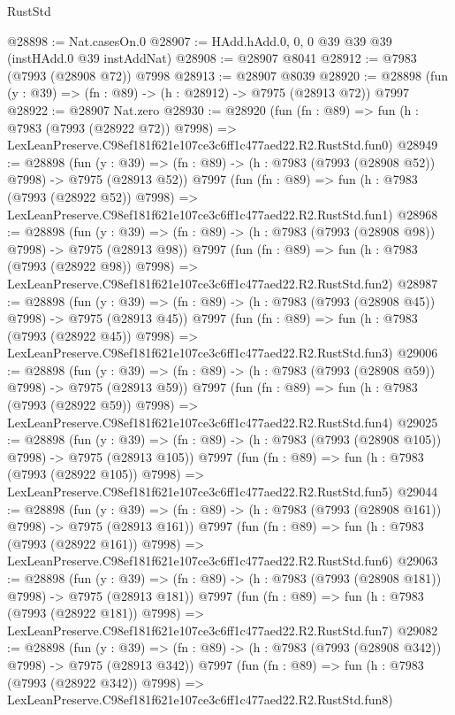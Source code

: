 \begin{lexlean}{RustStd}
\begin{coremodule}
@28898 := Nat.casesOn.{0}
@28907 := HAdd.hAdd.{0, 0, 0} @39 @39 @39 (instHAdd.{0} @39 instAddNat)
@28908 := @28907 @8041
@28912 := @7983 (@7993 (@28908 @72)) @7998
@28913 := @28907 @8039
@28920 := @28898 (fun (y : @39) => (fn : @89) -> (h : @28912) -> @7975 (@28913 @72)) @7997
@28922 := @28907 Nat.zero
@28930 := @28920
    (fun (fn : @89) =>
    fun (h : @7983 (@7993 (@28922 @72)) @7998) =>
    LexLeanPreserve.C98ef181f621e107ce3c6ff1c477aed22.R2.RustStd.fun0)
@28949 := @28898
    (fun (y : @39) => (fn : @89) -> (h : @7983 (@7993 (@28908 @52)) @7998) -> @7975 (@28913 @52))
    @7997
    (fun (fn : @89) =>
    fun (h : @7983 (@7993 (@28922 @52)) @7998) =>
    LexLeanPreserve.C98ef181f621e107ce3c6ff1c477aed22.R2.RustStd.fun1)
@28968 := @28898
    (fun (y : @39) => (fn : @89) -> (h : @7983 (@7993 (@28908 @98)) @7998) -> @7975 (@28913 @98))
    @7997
    (fun (fn : @89) =>
    fun (h : @7983 (@7993 (@28922 @98)) @7998) =>
    LexLeanPreserve.C98ef181f621e107ce3c6ff1c477aed22.R2.RustStd.fun2)
@28987 := @28898
    (fun (y : @39) => (fn : @89) -> (h : @7983 (@7993 (@28908 @45)) @7998) -> @7975 (@28913 @45))
    @7997
    (fun (fn : @89) =>
    fun (h : @7983 (@7993 (@28922 @45)) @7998) =>
    LexLeanPreserve.C98ef181f621e107ce3c6ff1c477aed22.R2.RustStd.fun3)
@29006 := @28898
    (fun (y : @39) => (fn : @89) -> (h : @7983 (@7993 (@28908 @59)) @7998) -> @7975 (@28913 @59))
    @7997
    (fun (fn : @89) =>
    fun (h : @7983 (@7993 (@28922 @59)) @7998) =>
    LexLeanPreserve.C98ef181f621e107ce3c6ff1c477aed22.R2.RustStd.fun4)
@29025 := @28898
    (fun (y : @39) => (fn : @89) -> (h : @7983 (@7993 (@28908 @105)) @7998) -> @7975 (@28913 @105))
    @7997
    (fun (fn : @89) =>
    fun (h : @7983 (@7993 (@28922 @105)) @7998) =>
    LexLeanPreserve.C98ef181f621e107ce3c6ff1c477aed22.R2.RustStd.fun5)
@29044 := @28898
    (fun (y : @39) => (fn : @89) -> (h : @7983 (@7993 (@28908 @161)) @7998) -> @7975 (@28913 @161))
    @7997
    (fun (fn : @89) =>
    fun (h : @7983 (@7993 (@28922 @161)) @7998) =>
    LexLeanPreserve.C98ef181f621e107ce3c6ff1c477aed22.R2.RustStd.fun6)
@29063 := @28898
    (fun (y : @39) => (fn : @89) -> (h : @7983 (@7993 (@28908 @181)) @7998) -> @7975 (@28913 @181))
    @7997
    (fun (fn : @89) =>
    fun (h : @7983 (@7993 (@28922 @181)) @7998) =>
    LexLeanPreserve.C98ef181f621e107ce3c6ff1c477aed22.R2.RustStd.fun7)
@29082 := @28898
    (fun (y : @39) => (fn : @89) -> (h : @7983 (@7993 (@28908 @342)) @7998) -> @7975 (@28913 @342))
    @7997
    (fun (fn : @89) =>
    fun (h : @7983 (@7993 (@28922 @342)) @7998) =>
    LexLeanPreserve.C98ef181f621e107ce3c6ff1c477aed22.R2.RustStd.fun8)

\end{coremodule}
\end{lexlean}

